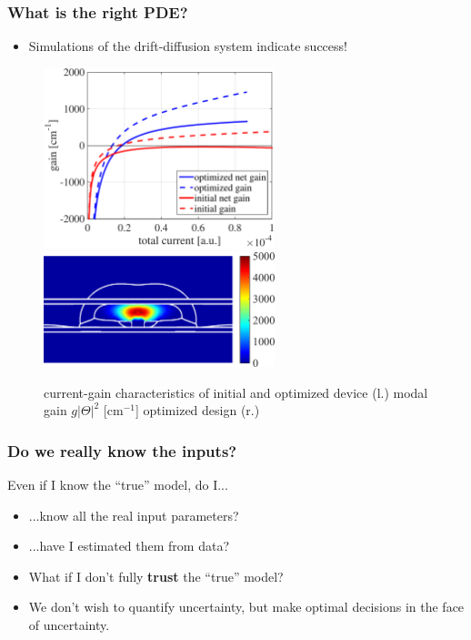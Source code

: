 \documentclass[aspectratio=169,xcolor=dvipsnames,10pt]{beamer}
\begin{document}
\begin{frame}\frametitle{What is the right PDE?}
\begin{example}
\begin{itemize}
\item Simulations of the drift-diffusion system indicate success! 
\end{itemize}
\begin{figure}
\qquad
\includegraphics[height=0.24\textwidth, width=0.6\textwidth, keepaspectratio]{Part I/figures/gain-1.pdf}\qquad
\includegraphics[height=0.24\textwidth, width=0.6\textwidth, keepaspectratio]{Part I/figures/gain_FINAL_new-1.png}%
\caption{
 current-gain characteristics  of initial and optimized device (l.) modal gain $g|\Theta|^2$ [cm$^{-1}$] optimized design (r.)}
\label{fig:gainsimulation}
\end{figure}
\end{example}
\end{frame}

\begin{frame}\frametitle{Do we \alert{really} know the inputs?}
\begin{exampleblock}{}
Even if I know the ``true'' model, do I...
\begin{itemize}
\item ...know all the real input parameters?
\item ...have I estimated them from data? 
\end{itemize}
\begin{itemize}
\item What if I don't fully \textbf{trust} the ``true'' model? 
\item We don't wish to \alert{quantify uncertainty}, but \alert{make optimal decisions} in the face of uncertainty.
\end{itemize}
\end{exampleblock}

\end{frame}
\end{document}
